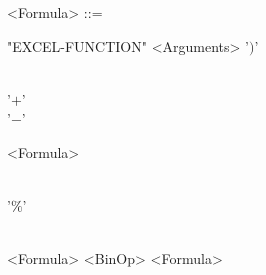 \begin{grammar}
	<Formula> ::= 
	\begin{syntdiag}[\footnotesize\sdlengths]
		\begin{stack} 
			\begin{stack}
				"EXCEL-FUNCTION" <Arguments> '$)$' \\
				\begin{stack} \\ '$+$' \\ '$-$' \end{stack} <Formula> \begin{stack} \\ '$\%$' \end{stack}\\ 
				<Formula> <BinOp> <Formula>
			\end{stack} \\

\end{stack}
\end{syntdiag}
\end{grammar}
